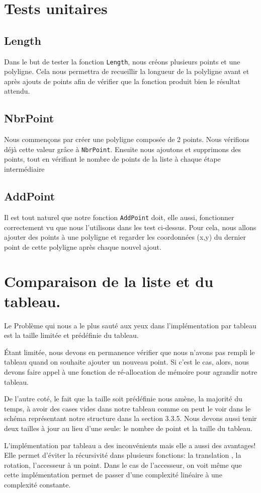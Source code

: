 \documentclass[a4paper, 11pt, oneside]{article}
\begin{document}
\section{Tests unitaires}

\subsection{Length}
Dans le but de tester la fonction \texttt{Length}, nous créons plusieurs points et une polyligne. Cela nous permettra de recueillir la longueur de la polyligne avant et après ajouts de points afin de vérifier que la fonction produit bien le résultat attendu.

\subsection{NbrPoint }
Nous commençons par créer une polyligne composée de 2 points. Nous vérifions déjà cette valeur grâce à \texttt{NbrPoint}. Ensuite nous ajoutons et supprimons des points, tout en vérifiant le nombre de points de la liste à chaque étape intermédiaire


\subsection{AddPoint}
Il est tout naturel que notre fonction \texttt{AddPoint} doit, elle aussi, fonctionner correctement vu que nous l'utilisons dans les test ci-dessus. Pour cela, nous allons ajouter des points à une polyligne et regarder les coordonnées (x,y) du dernier point de cette polyligne après chaque nouvel ajout.

\section{Comparaison de la liste et du tableau.}

Le Problème qui nous a le plus sauté aux yeux dans l'implémentation par tableau est la taille limitée et prédéfinie du tableau. 

Étant limitée, nous devons en permanence vérifier que nous n'avons pas rempli le tableau quand on souhaite ajouter un nouveau point. Si c'est le cas, alors, nous devons faire appel à une fonction de ré-allocation de mémoire pour agrandir notre tableau.

De l'autre coté, le fait que la taille soit prédéfinie nous amène, la majorité du temps, à avoir des cases vides dans notre tableau comme on peut le voir dans le schéma représentant notre structure dans la section 3.3.5. Nous devons aussi tenir deux tailles à jour au lieu d'une seule: le nombre de point et la taille du tableau.

L'implémentation par tableau a des inconvénients mais elle a aussi des avantages! Elle permet d'éviter la récursivité dans plusieurs fonctions: la translation , la rotation, l'accesseur à un point. Dans le cas de l'accesseur, on voit même que cette implémentation permet de passer d'une complexité linéaire à une complexité constante.
\end{document}
